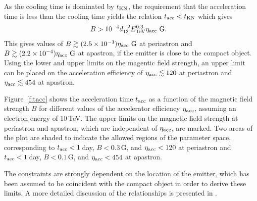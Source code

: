 \documentclass[preprint2]{aastex}
\newcommand{\tev}{\,TeV}
\begin{document}
As the cooling time is dominated by $t_{\mbox{\scriptsize{KN}}}$, the requirement that the acceleration time is less than the cooling time yields the relation $t_{\mbox{\scriptsize{acc}}} < t_{\mbox{\scriptsize{KN}}}$ which gives
\begin{equation}
B > 10^{-4} d_{13}^{-2} E_{\mbox{\scriptsize{TeV}}}^{0.3} \eta_{\mbox{\scriptsize{acc}}} \,\mbox{\,G}.
\end{equation}
This gives values of $B \gtrsim (2.5 \times 10^{-3}) \eta_{\mbox{\scriptsize{acc}}} \,\mbox{\,G}$ at periastron and $B \gtrsim (2.2 \times 10^{-4}) \eta_{\mbox{\scriptsize{acc}}} \,\mbox{\,G}$ at apastron, if the emitter is close to the compact object. Using the lower and upper limits on the magentic field strength, an upper limit can be placed on the acceleration efficiency of $\eta_{\mbox{\scriptsize{acc}}} \lesssim 120$ at periastron and $\eta_{\mbox{\scriptsize{acc}}} \lesssim 454$ at apastron.

Figure~\ref{f:tacc} shows the acceleration time $t_{\mbox{\scriptsize{acc}}}$ as a function of the magnetic field strength $B$ for different values of the accelerator efficiency $\eta_{\mbox{\scriptsize{acc}}}$, assuming an electron energy of 10\tev{}. The upper limits on the magnetic field strength at periastron and apastron, which are independent of $\eta_{\mbox{\scriptsize{acc}}}$, are marked. Two areas of the plot are shaded to indicate the allowed regions of the parameter space, corresponding to $t_{\mbox{\scriptsize{acc}}} < 1$\,day, $B < 0.3$\,G, and $\eta_{\mbox{\scriptsize{acc}}} < 120$ at periastron and $t_{\mbox{\scriptsize{acc}}} < 1$\,day, $B < 0.1$\,G, and $\eta_{\mbox{\scriptsize{acc}}} < 454$ at apastron.

The constraints are strongly dependent on the location of the emitter, which has been assumed to be coincident with the compact object in order to derive these limits. A more detailed discussion of the relationships is presented in \citet{2008MNRAS.383..467K}.
\end{document}
